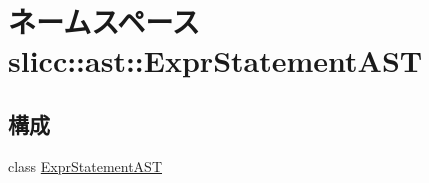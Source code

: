 \hypertarget{namespaceslicc_1_1ast_1_1ExprStatementAST}{
\section{ネームスペース slicc::ast::ExprStatementAST}
\label{namespaceslicc_1_1ast_1_1ExprStatementAST}
}
\subsection*{構成}
\begin{DoxyCompactItemize}
\item 
class \hyperlink{classslicc_1_1ast_1_1ExprStatementAST_1_1ExprStatementAST}{ExprStatementAST}
\end{DoxyCompactItemize}
